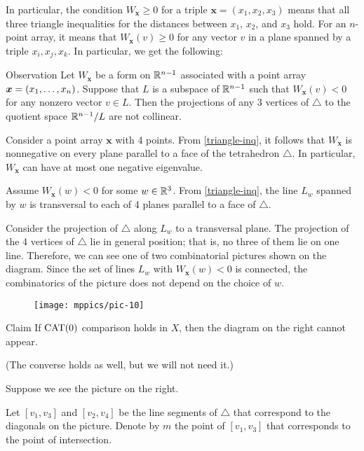 \documentclass{article}
\begin{document}
In particular, the condition $W_{\bm{x}}\ge 0$ for a triple $\bm{x}=(x_1,x_2,x_3)$ means that 
all three triangle inequalities for the distances between $x_1$, $x_2$, and $x_3$ hold.
For an $n$-point array, it means that $W_{\bm{x}}(v)\ge 0$ for any vector $v$ in a plane spanned by a triple $x_i,x_j,x_k$.
In particular, we get the following:

\begin{thm}{Observation}\label{triangle-inq}
Let $W_{\bm{x}}$ be a form on $\mathbb{R}^{n-1}$ associated with a point array $\bm{x}\z=(x_1,\dots,x_n)$.
Suppose that $L$ is a subspace of $\mathbb{R}^{n-1}$ such that
$W_{\bm{x}}(v)< 0$ for any nonzero vector $v\in L$.
Then the projections of any 3 vertices of $\triangle$ to the quotient space $\mathbb{R}^{n-1}/L$ are not collinear.
\end{thm}

Consider a point array $\bm{x}$ with 4 points.
From \ref{triangle-inq}, 
it follows that $W_{\bm{x}}$ 
is nonnegative on every plane parallel to a face of the tetrahedron $\triangle$.
In particular, $W_{\bm{x}}$ can have at most one negative eigenvalue.

Assume $W_{\bm{x}}(w)<0$ for some $w\in\mathbb{R}^3$.
From \ref{triangle-inq}, the line $L_w$ spanned by
$w$ is transversal to each of 4 planes parallel to a face of $\triangle$.

Consider the projection of $\triangle$ along $L_w$ to a transversal plane. 
The projection of the 4 vertices of $\triangle$ lie in general position; 
that is, no three of them lie on one line.
Therefore, we can see one of two combinatorial pictures shown on the diagram.
Since the set of lines $L_w$ with $W_{\bm{x}}(w)<0$ is connected,
the combinatorics of the picture does not depend on the choice of $w$.

{

\begin{wrapfigure}{r}{33mm}
\vskip-0mm
\centering
\texttt{[image: mppics/pic-10]}
\end{wrapfigure}

\begin{thm}{Claim}
If $\mathrm{CAT}(0)$ comparison holds in $X$, then the diagram on the right cannot appear. 
\end{thm}

(The converse holds as well, but we will not need it.)

}

Suppose we see the picture on the right.

Let $[v_1,v_3]$ and $[v_2,v_4]$ be the line segments of $\triangle$ that correspond to the diagonals on the picture.
Denote by $m$ the point of $[v_1,v_3]$ that corresponds to the point of intersection.
\end{document}
